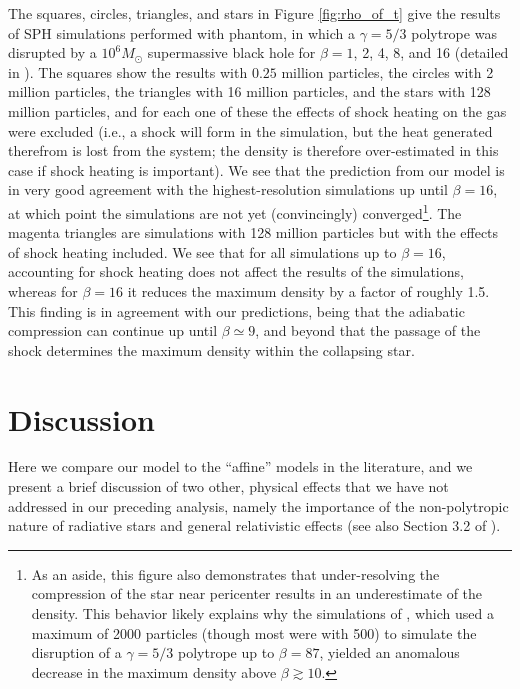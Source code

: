 \documentclass[twocolumn]{aastex62}
\begin{document}
The squares, circles, triangles, and stars in Figure \ref{fig:rho_of_t} give the results of SPH simulations performed with {\sc phantom}, in which a $\gamma = 5/3$ polytrope was disrupted by a $10^6 M_{\odot}$ supermassive black hole for $\beta = 1$, 2, 4, 8, and 16 (detailed in \citealt{norman21}). The squares show the results with $0.25$ million particles, the circles with 2 million particles, the triangles with 16 million particles, and the stars with 128 million particles, and for each one of these the effects of shock heating on the gas were excluded (i.e., a shock will form in the simulation, but the heat generated therefrom is lost from the system; the density is therefore over-estimated in this case if shock heating is important). We see that the prediction from our model is in very good agreement with the highest-resolution simulations up until $\beta = 16$, at which point the simulations are not yet (convincingly) converged\footnote{As an aside, this figure also demonstrates that under-resolving the compression of the star near pericenter results in an underestimate of the density. This behavior likely explains why the simulations of \citet{Bicknell:1983aa}, which used a maximum of 2000 particles (though most were with 500) to simulate the disruption of a $\gamma = 5/3$ polytrope up to $\beta = 87$, yielded an anomalous decrease in the maximum density above $\beta \gtrsim 10$.}. The magenta triangles are simulations with 128 million particles but with the effects of shock heating included. We see that for all simulations up to $\beta = 16$, accounting for shock heating does not affect the results of the simulations, whereas for $\beta = 16$ it reduces the maximum density by a factor of roughly 1.5. This finding is in agreement with our predictions, being that the adiabatic compression can continue up until $\beta \simeq 9$, and beyond that the passage of the shock determines the maximum density within the collapsing star.

\section{{Discussion}}
\label{sec:discussion}
{Here we compare our model to the ``affine'' models in the literature, and we present a brief discussion of two other, physical effects that we have not addressed in our preceding analysis, namely the importance of the non-polytropic nature of radiative stars and general relativistic effects (see also Section 3.2 of \citealt{norman21}).}
\end{document}
